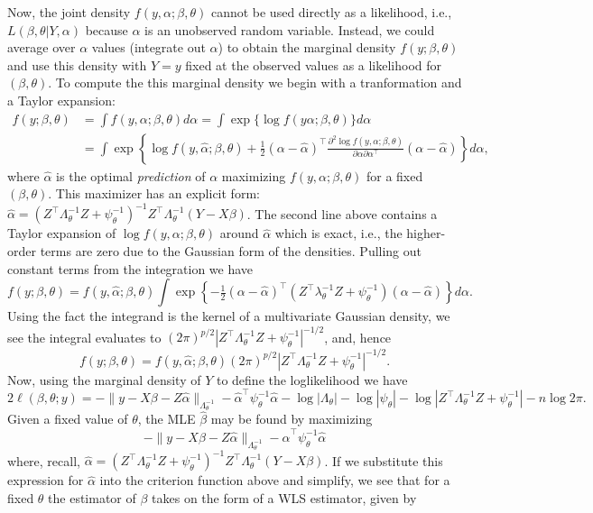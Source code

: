 \documentclass[
]{book}
\begin{document}
Now, the joint density \(f(y,\alpha;\beta,\theta)\) cannot be used directly as a likelihood, i.e., \(L(\beta, \theta| Y,\alpha)\) because \(\alpha\) is an unobserved random variable. Instead, we could average over \(\alpha\) values (integrate out \(\alpha\)) to obtain the marginal density \(f(y;\beta,\theta)\) and use this density with \(Y=y\) fixed at the observed values as a likelihood for \((\beta, \theta)\). To compute the this marginal density we begin with a tranformation and a Taylor expansion:
\begin{align*}
f(y;\beta, \theta) &= \int f(y,\alpha;\beta, \theta)d\alpha = \int \exp\{\log f(y\alpha;\beta,\theta)\}d\alpha \\ 
& = \int \exp\left\{\log f(y,\hat\alpha;\beta,\theta) + \tfrac12 (\alpha -\hat\alpha)^\top \frac{\partial^2 \log f(y,\alpha;\beta,\theta)}{\partial \alpha \partial\alpha^\top}(\alpha - \hat\alpha)\right\}d\alpha,
\end{align*}
where \(\hat\alpha\) is the optimal \emph{prediction} of \(\alpha\) maximizing \(f(y,\alpha;\beta,\theta)\) for a fixed \((\beta,\theta)\). This maximizer has an explicit form: \(\hat\alpha = (Z^\top \Lambda_\theta^{-1}Z + \psi_\theta^{-1})^{-1}Z^\top \Lambda_\theta^{-1}(Y - X\beta)\). The second line above contains a Taylor expansion of \(\log f(y,\alpha;\beta,\theta)\) around \(\hat\alpha\) which is exact, i.e., the higher-order terms are zero due to the Gaussian form of the densities. Pulling out constant terms from the integration we have
\[f(y;\beta, \theta) = f(y, \hat\alpha;\beta, \theta)\int \exp\left\{-\tfrac12 (\alpha -\hat\alpha)^\top (Z^\top \lambda_\theta^{-1}Z + \psi_\theta^{-1})(\alpha - \hat\alpha)\right\}d\alpha.\]
Using the fact the integrand is the kernel of a multivariate Gaussian density, we see the integral evaluates to \((2\pi)^{p/2}|Z^\top \Lambda_\theta^{-1}Z+\psi_\theta^{-1}|^{-1/2}\), and, hence
\[f(y;\beta, \theta) = f(y, \hat\alpha;\beta, \theta)(2\pi)^{p/2}|Z^\top \Lambda_\theta^{-1}Z+\psi_\theta^{-1}|^{-1/2}.\]
Now, using the marginal density of \(Y\) to define the loglikelihood we have
\[2\ell(\beta,\theta;y) = -\|y - X\beta - Z\hat\alpha\|_{\Lambda_\theta^{-1}}-\hat\alpha^\top \psi_\theta^{-1}\hat\alpha - \log|\Lambda_\theta|-\log|\psi_\theta|-\log|Z^\top\Lambda_\theta^{-1}Z+\psi_\theta^{-1}|-n\log 2\pi.\]
Given a fixed value of \(\theta\), the MLE \(\hat\beta\) may be found by maximizing
\[-\|y - X\beta - Z\hat\alpha\|_{\Lambda_\theta^{-1}}-\hat\alpha^\top \psi_\theta^{-1}\hat\alpha\]
where, recall, \(\hat\alpha = (Z^\top \Lambda_\theta^{-1}Z + \psi_\theta^{-1})^{-1}Z^\top \Lambda_\theta^{-1}(Y - X\beta)\). If we substitute this expression for \(\hat\alpha\) into the criterion function above and simplify, we see that for a fixed \(\theta\) the estimator of \(\beta\) takes on the form of a WLS estimator, given by
\end{document}
